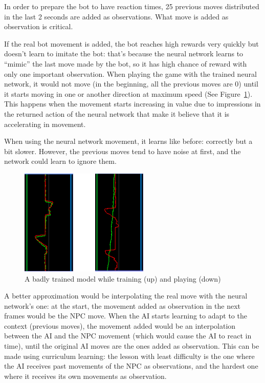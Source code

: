 In order to prepare the bot to have reaction times, 25 previous moves distributed in the last 2 seconds are added as observations. What move is added as observation is critical.

If the real bot movement is added, the bot reaches high rewards very quickly but doesn't learn to imitate the bot: that's because the neural network learns to ``mimic'' the last move made by the bot, so it has high chance of reward with only one important observation. When playing the game with the trained neural network, it would not move (in the beginning, all the previous moves are 0) until it starts moving in one or another direction at maximum speed (See Figure~\ref{fig:graphMem}). This happens when the movement starts increasing in value due to impressions in the returned action of the neural network that make it believe that it is accelerating in movement.

When using the neural network movement, it learns like before: correctly but a bit slower. However, the previous moves tend to have noise at first, and the network could learn to ignore them.

\begin{figure}[h]
  \centering
		\includegraphics[width=.5\textwidth]{img/graphsMemory.png}
  \caption{A badly trained model while training (up) and playing (down)}
  \label{fig:graphMem}
\end{figure}

A better approximation would be interpolating the real move with the neural network's one: at the start, the movement added as observation in the next frames would be the NPC move. When the AI starts learning to adapt to the context (previous moves), the movement added would be an interpolation between the AI and the NPC movement (which would cause the AI to react in time), until the original AI moves are the ones added as observation. This can be made using curriculum learning: the lesson with least difficulty is the one where the AI receives past movements of the NPC as observations, and the hardest one where it receives its own movements as observation.

